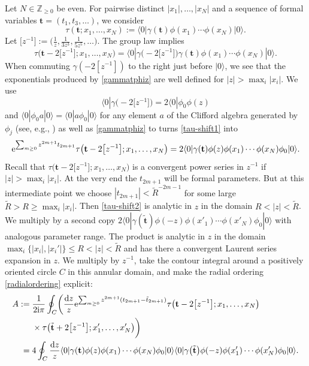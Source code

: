 \documentclass[pdftex]{sigma}
\numberwithin{equation}{section}
\newcommand{\dd}{\mathrm{d}}
\begin{document}
Let $N\in \mathbb{Z}_{\geq 0}$ be even. For pairwise distinct $|x_1|,\dots,|x_N|$
and a sequence of formal variables $\mathbf{t}=(t_1,t_3,\dots)$, we consider
\[
 \tau(\mathbf{t};x_1,\dots,x_N):= \langle 0 | \gamma(\mathbf{t})
 \phi(x_1)\cdots \phi(x_N)|0\rangle.
\]
Let $\bigl[z^{-1}\bigr]:=\bigl(\frac{1}{z},\frac{1}{3z^3},
\frac{1}{5 z^5},\dots\bigr)$.
 The group law implies
 \begin{equation}
 \tau\bigl(\mathbf{t}-2\bigl[z^{-1}\bigr];x_1,\dots,x_N\bigr) =\langle 0|
 \gamma\bigl(-2\bigl[z^{-1}\bigr]\bigr)
 \gamma(\mathbf{t}) \phi(x_1)\cdots \phi(x_N) |0\rangle.
\label{tau-shift1}
\end{equation}
When commuting $\gamma(-2[z^{-1}])$ to the right just before $|0\rangle$,
we see that the exponentials produced by \eqref{gammatphiz}
are well defined for $|z|>\max_i |x_i|$. We use
\cite[Lemma 7.3.9]{harnad_balogh_2021}
\[
 \langle 0|\gamma\bigl(-2\bigl[z^{-1}\bigr]\bigr)=2
 \langle 0|\phi_0 \phi(z)
\]
and
$\langle 0|\phi_0 a|0 \rangle=
\langle 0|a\phi_0 |0 \rangle$ for any element $a$ of the Clifford algebra
generated by $\phi_j$ (see, e.g., \cite[Exercise 7.5]{harnad_balogh_2021})
as well as \eqref{gammatphiz} to turns \eqref{tau-shift1} into
\begin{equation}
{\rm e}^{\sum_{m \geq 0} z^{2m+1}t_{2m+1}} \tau\bigl(\mathbf{t}-2\bigl[z^{-1}\bigr];x_1,\dots,x_N\bigr)
= 2 \langle 0|\gamma(\mathbf{t}) \phi(z)
\phi(x_1)\cdots \phi(x_N)\phi_0|0\rangle .
 \label{tau-shift2}
\end{equation}
Recall that $\tau\bigl(\mathbf{t}-2\bigl[z^{-1}\bigr];x_1,\dots,x_N\bigr)$ is a convergent
power series in $z^{-1}$ if $|z|>\max_i |x_i|$. At the very end the
$t_{2m+1}$ will be formal parameters. But at this intermediate point we
choose $|t_{2m+1}|<\tilde{R}^{-2m-1}$ for some large
$\tilde{R}> R\geq \max_i |x_i|$. Then \eqref{tau-shift2} is analytic
in $z$ in the domain $R<|z|<\tilde{R}$. We multiply by a second copy
$2 \langle 0|\gamma(\tilde{\mathbf{t}}) \phi(-z) \phi(x'_1)\cdots
\phi(x'_N)\phi_0|0\rangle$ with analogous parameter range. The
product is analytic in $z$ in the domain $\max_i \{|x_i|,|x_i'|\} \leq R <|z|<\tilde{R}$
and has there a convergent Laurent series expansion in $z$. We
multiply by $z^{-1}$, take the contour integral around a positively oriented circle $C$ in this annular domain, and make the radial
ordering \eqref{radialordering} explicit:
\begin{align*}
A:={}& \frac{1}{2{\rm i}\pi} \oint_{C} \biggl(\frac{\dd z}{z}
{\rm e}^{\sum_{m \geq 0} z^{2m+1}(t_{2m+1}-\tilde{t}_{2m+1})}
\tau\bigl(\mathbf{t}-2\bigl[z^{-1}\bigr];x_1,\dots,x_N\bigr)
\\ &
\times \tau\bigl(\tilde{\mathbf{t}}+2\bigl[z^{-1}\bigr];x_1',\dots,x_N'\bigr)\biggr)
\\
={}&  4 \oint_{C} \frac{\dd z}{z}
\langle 0|\gamma(\mathbf{t}) \phi(z) \phi(x_1)\cdots \phi(x_N) \phi_0|0\rangle
\langle 0|\gamma\bigl(\tilde{\mathbf{t}}\bigr) \phi(-z) \phi(x_1')\cdots \phi(x_N')
\phi_0|0\rangle.
\end{align*}
\end{document}
